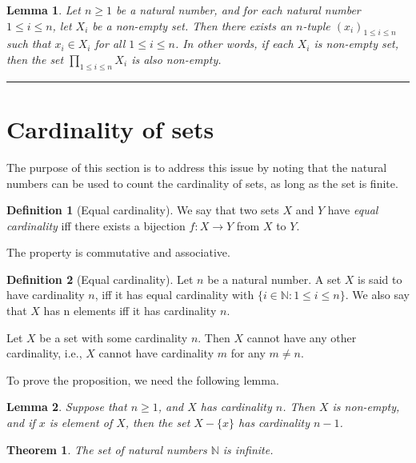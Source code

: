 \documentclass[
]{book}
\newtheorem{theorem}{Theorem}[chapter]
\newtheorem{lemma}{Lemma}[chapter]
\theoremstyle{definition}
\newtheorem{definition}{Definition}[chapter]
\theoremstyle{definition}
\theoremstyle{definition}
\theoremstyle{definition}
\theoremstyle{remark}
\begin{document}
\begin{lemma}
\protect\hypertarget{lem:finitechoice}{}\label{lem:finitechoice}Let \(n\geq 1\) be a natural number, and for each natural number \(1\leq i\leq n\), let \(X_i\) be a non-empty set. Then there exists an \(n\)-tuple \((x_i)_{1\leq i\leq n}\) such that \(x_i\in X_i\) for all \(1\leq i\leq n\). In other words, if each \(X_i\) is non-empty set, then the set \(\prod_{1\leq i\leq n}X_i\) is also non-empty.
\end{lemma}

\begin{center}\rule{0.5\linewidth}{0.5pt}\end{center}

\section{Cardinality of sets}\label{cardinality-of-sets}

The purpose of this section is to address this issue by noting that the natural numbers can be used to count the cardinality of sets, as long as the set is finite.

\begin{definition}[Equal cardinality]
We say that two sets \(X\) and \(Y\) have \emph{equal cardinality} iff there exists a bijection \(f:X\to Y\) from \(X\) to \(Y\).
\end{definition}

The property is commutative and associative.

\begin{definition}[Equal cardinality]
Let \(n\) be a natural number. A set \(X\) is said to have cardinality \(n\), iff it has equal cardinality with \(\{i\in \mathbb{N}:1\leq i\leq n\}\). We also say that \(X\) has n elements iff it has cardinality \(n\).
\end{definition}

Let \(X\) be a set with some cardinality \(n\). Then \(X\) cannot have any other cardinality, i.e., \(X\) cannot have cardinality \(m\) for any \(m\ne n\).

To prove the proposition, we need the following lemma.

\begin{lemma}
Suppose that \(n\geq 1\), and \(X\) has cardinality \(n\). Then \(X\) is non-empty, and if \(x\) is element of \(X\), then the set \(X-\{x\}\) has cardinality \(n-1\).
\end{lemma}

\begin{theorem}
The set of natural numbers \(\mathbb{N}\) is infinite.
\end{theorem}
\end{document}
